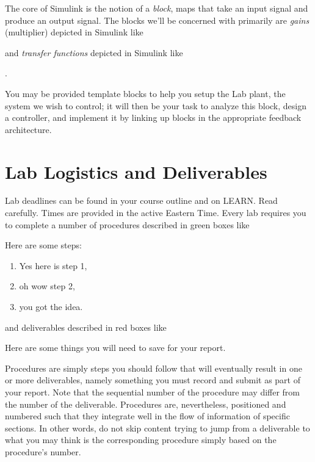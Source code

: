 The core of Simulink is the notion of a \emph{block}, maps that take an input
signal and produce an output signal.
The blocks we'll be concerned with primarily are \emph{gains}
(multiplier) depicted in Simulink like
\begin{center}
\end{center}
and \emph{transfer functions} depicted in Simulink like
\begin{center}
  .
\end{center}
You may be provided template blocks to help you setup the Lab plant, the
system we wish to control; it will then be your task to analyze this block,
design a controller, and implement it by linking up blocks
in the appropriate feedback architecture.

\section{Lab Logistics and Deliverables}\label{intro:logistics}
Lab deadlines can be found in your course outline and on LEARN.
Read carefully.
Times are provided in the active Eastern Time.
Every lab requires you to complete a number of procedures described in green boxes like
\begin{procedure}[]
  Here are some steps:
  \begin{enumerate}[label=(\arabic*)]
    \item{Yes here is step 1,}
    \item{oh wow step 2,}
    \item{you got the idea.}
  \end{enumerate}
\end{procedure}
\noindent
and deliverables described in red boxes like
\begin{deliverable}[]
  Here are some things you will need to save for your report.
\end{deliverable}
Procedures are simply steps you should follow that will eventually result in one or more deliverables, namely something you must record and submit as part of your report. {\color{red}Note that the sequential number of the procedure may differ from the number of the deliverable. Procedures are, nevertheless, positioned and numbered such that they integrate well in the flow of information of specific sections. In other words, do not skip content trying to jump from a deliverable to what you may think is the corresponding procedure simply based on the procedure's number.}\\

